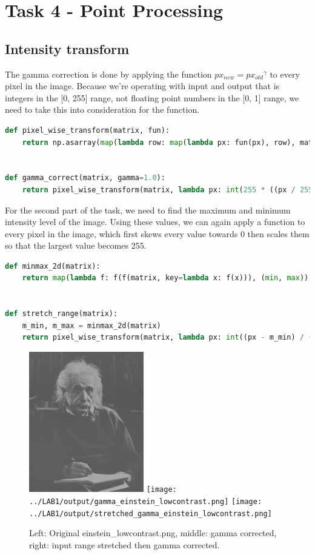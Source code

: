 \clearpage
\section*{Task 4 - Point Processing}

\subsection*{Intensity transform}

The gamma correction is done by applying the function $px_{new} = {px_{old}}^{\gamma}$ to every pixel in the image.
Because we're operating with input and output that is integers in the [0, 255] range, not floating point numbers in the [0, 1] range, we need to take this into consideration for the function.
\begin{lstlisting}[language=Python, label=gamma_correction, caption=Gamma correction]
def pixel_wise_transform(matrix, fun):
    return np.asarray(map(lambda row: map(lambda px: fun(px), row), matrix))


def gamma_correct(matrix, gamma=1.0):
    return pixel_wise_transform(matrix, lambda px: int(255 * ((px / 255) ** gamma)))
\end{lstlisting}

For the second part of the task, we need to find the maximum and minimum intensity level of the image.
Using these values, we can again apply a function to every pixel in the image,
which first skews every value towards 0 then scales them so that the largest value becomes 255.

\begin{lstlisting}[language=Python, label=input_range, caption=Input range stretching]
def minmax_2d(matrix):
    return map(lambda f: f(f(matrix, key=lambda x: f(x))), (min, max))


def stretch_range(matrix):
    m_min, m_max = minmax_2d(matrix)
    return pixel_wise_transform(matrix, lambda px: int((px - m_min) / ((m_max - m_min) / 255)))
\end{lstlisting}

\begin{figure}[h!]
    \centering
    \includegraphics[width=5cm]{../LAB1/img/einstein_lowcontrast.png}
    \texttt{[image: ../LAB1/output/gamma\_einstein\_lowcontrast.png]}
    \texttt{[image: ../LAB1/output/stretched\_gamma\_einstein\_lowcontrast.png]}
    \caption{Left: Original einstein\_lowcontrast.png, middle: gamma corrected, right: input range stretched then gamma corrected.}
\end{figure}

